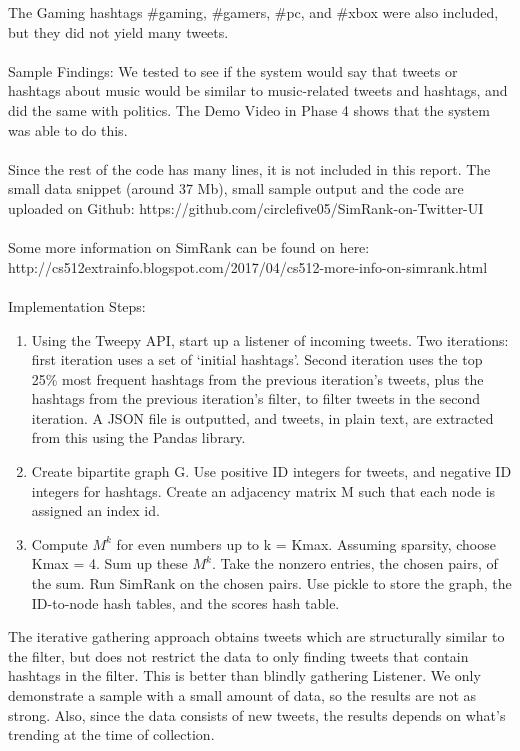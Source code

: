 \documentclass[10pt]{article}
\begin{document}
The Gaming hashtags \#gaming, \#gamers, \#pc, and \#xbox were also included, but they did not yield many tweets.
\\\\
Sample Findings: We tested to see if the system would say that tweets or hashtags about music would be similar to music-related tweets and hashtags, and did the same with politics. The Demo Video in Phase 4 shows that the system was able to do this.
\\\\
Since the rest of the code has many lines, it is not included in this report. The small data snippet (around 37 Mb), small sample output and the code are uploaded on Github: 
https://github.com/circlefive05/SimRank-on-Twitter-UI
\\\\
Some more information on SimRank can be found on here: http://cs512extrainfo.blogspot.com/2017/04/cs512-more-info-on-simrank.html
\\\\
Implementation Steps:
\begin{enumerate}
	\item Using the Tweepy API, start up a listener of incoming tweets. Two iterations: first iteration uses a set of ‘initial hashtags’. Second iteration uses the top 25\% most frequent hashtags from the previous iteration’s tweets, plus the hashtags from the previous iteration’s filter, to filter tweets in the second iteration. A JSON file is outputted, and tweets, in plain text, are extracted from this using the Pandas library.
\item Create bipartite graph G. Use positive ID integers for tweets, and negative ID integers for hashtags. Create an adjacency matrix M such that each node is assigned an index id.
\item Compute $M^k$ for even numbers up to k = Kmax. Assuming sparsity, choose Kmax = 4. Sum up these $M^k$. Take the nonzero entries, the chosen pairs, of the sum. Run SimRank on the chosen pairs. Use pickle to store the graph, the ID-to-node hash tables, and the scores hash table. 
\end{enumerate}	
The iterative gathering approach obtains tweets which are structurally similar to the filter, but does not restrict the data to only finding tweets that contain hashtags in the filter. This is better than blindly gathering Listener. We only demonstrate a sample with a small amount of data, so the results are not as strong. Also, since the data consists of new tweets, the results depends on what’s trending at the time of collection.


\end{document}
